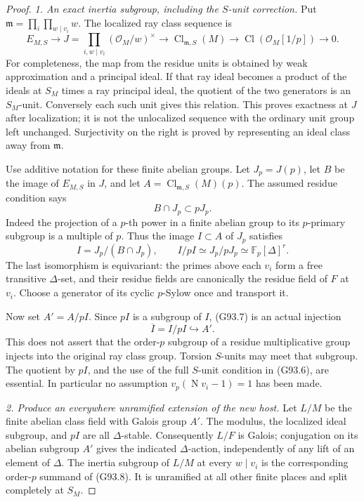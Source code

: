 \begin{proof}
\emph{1. An exact inertia subgroup, including the \(S\)-unit correction.}
Put \(\mathfrak m=\prod_i\prod_{w\mid v_i}w\).  The localized
ray class sequence is
\[
 E_{M,S}\longrightarrow
 J=\prod_{i,w\mid v_i}(\mathcal O_M/w)^\times
 \longrightarrow \operatorname{Cl}_{\mathfrak m,S}(M)
 \longrightarrow\operatorname{Cl}(\mathcal O_M[1/p])
 \longrightarrow0.
 \tag{G93.5}
\]
For completeness, the map from the residue units is obtained by
weak approximation and a principal ideal.  If that ray ideal becomes
a product of the ideals at \(S_M\) times a ray principal ideal,
the quotient of the two generators is an \(S_M\)-unit.  Conversely
each such unit gives this relation.  This proves exactness at \(J\)
after localization; it is not the unlocalized sequence with the
ordinary unit group left unchanged.  Surjectivity on the right is
proved by representing an ideal class away from \(\mathfrak m\).

Use additive notation for these finite abelian groups.  Let
\(J_p=J(p)\), let \(B\) be the image of \(E_{M,S}\) in \(J\),
and let \(A=\operatorname{Cl}_{\mathfrak m,S}(M)(p)\).
The assumed residue condition says
\[
 B\cap J_p\subset pJ_p.
 \tag{G93.6}
\]
Indeed the projection of a \(p\)-th power in a finite abelian
group to its \(p\)-primary subgroup is a multiple of \(p\).
Thus the image \(I\subset A\) of \(J_p\) satisfies
\[
 I=J_p/(B\cap J_p),\qquad
 I/pI\simeq J_p/pJ_p\simeq\mathbb F_p[\Delta]^r.
 \tag{G93.7}
\]
The last isomorphism is equivariant: the primes above each \(v_i\)
form a free transitive \(\Delta\)-set, and their residue fields
are canonically the residue field of \(F\) at \(v_i\).
Choose a generator of its cyclic \(p\)-Sylow once and transport it.

Now set \(A'=A/pI\).  Since \(pI\) is a subgroup of \(I\),
(G93.7) is an actual injection
\[
 \overline I=I/pI\hookrightarrow A'.
 \tag{G93.8}
\]
This does not assert that the order-\(p\) subgroup of a residue
multiplicative group injects into the original ray class group.
Torsion \(S\)-units may meet that subgroup.  The quotient by
\(pI\), and the use of the full \(S\)-unit condition in (G93.6),
are essential.  In particular no assumption
\(v_p(\operatorname N v_i-1)=1\) has been made.

\emph{2. Produce an everywhere unramified extension of the new host.}
Let \(L/M\) be the finite abelian class field with Galois group
\(A'\).  The modulus, the localized ideal subgroup, and \(pI\)
are all \(\Delta\)-stable.  Consequently \(L/F\) is Galois;
conjugation on its abelian subgroup \(A'\) gives the indicated
\(\Delta\)-action, independently of any lift of an element of
\(\Delta\).
The inertia subgroup of \(L/M\) at every \(w\mid v_i\) is the
corresponding order-\(p\) summand of (G93.8).  It is unramified
at all other finite places and split completely at \(S_M\).


\end{proof}
